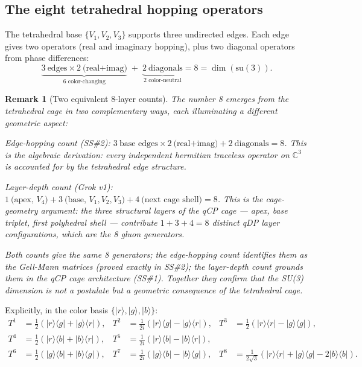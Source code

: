 \documentclass[11pt,letterpaper]{article}
\newtheorem{remark}[theorem]{Remark}
\newcommand{\ket}[1]{|#1\rangle}
\newcommand{\bra}[1]{\langle#1|}
\begin{document}
\subsection{The eight tetrahedral hopping operators}

The tetrahedral base $\{V_1, V_2, V_3\}$ supports three undirected
edges.  Each edge gives two operators (real and imaginary hopping),
plus two diagonal operators from phase differences:
\begin{equation}
\underbrace{3\ \text{edges}\times2\ \text{(real+imag)}}_{\text{6 color-changing}}
\;+\;\underbrace{2\ \text{diagonals}}_{\text{2 color-neutral}}
= 8 = \dim(\mathrm{su}(3)).
\label{eq:count}
\end{equation}

\begin{remark}[Two equivalent 8-layer counts]
\label{rem:two_counts}
The number 8 emerges from the tetrahedral cage in two complementary
ways, each illuminating a different geometric aspect:

\textit{Edge-hopping count (SS\#2):}
$3\ \text{base edges}\times2\ \text{(real+imag)} + 2\ \text{diagonals} = 8$.
This is the algebraic derivation: every independent hermitian traceless
operator on $\mathbb{C}^3$ is accounted for by the tetrahedral edge structure.

\textit{Layer-depth count (Grok v1):}
$1\ \text{(apex, }V_4\text{)} + 3\ \text{(base, }V_1,V_2,V_3\text{)} +
4\ \text{(next cage shell)} = 8$.
This is the cage-geometry argument: the three structural layers of the
qCP cage — apex, base triplet, first polyhedral shell — contribute
$1+3+4 = 8$ distinct qDP layer configurations, which are the 8 gluon
generators.

Both counts give the same 8 generators; the edge-hopping count
identifies them as the Gell-Mann matrices (proved exactly in SS\#2);
the layer-depth count grounds them in the qCP cage architecture
(SS\#1).  Together they confirm that the SU(3) dimension is not a
postulate but a geometric consequence of the tetrahedral cage.
\end{remark}

Explicitly, in the color basis
$\{\ket{r},\ket{g},\ket{b}\}$:
\begin{align*}
T^1 &= \tfrac{1}{2}(\ket{r}\bra{g}+\ket{g}\bra{r}),&
T^2 &= \tfrac{1}{2i}(\ket{r}\bra{g}-\ket{g}\bra{r}),&
T^3 &= \tfrac{1}{2}(\ket{r}\bra{r}-\ket{g}\bra{g}),\\
T^4 &= \tfrac{1}{2}(\ket{r}\bra{b}+\ket{b}\bra{r}),&
T^5 &= \tfrac{1}{2i}(\ket{r}\bra{b}-\ket{b}\bra{r}),\\
T^6 &= \tfrac{1}{2}(\ket{g}\bra{b}+\ket{b}\bra{g}),&
T^7 &= \tfrac{1}{2i}(\ket{g}\bra{b}-\ket{b}\bra{g}),&
T^8 &= \tfrac{1}{2\sqrt3}(\ket{r}\bra{r}+\ket{g}\bra{g}-2\ket{b}\bra{b}).
\end{align*}
\end{document}
